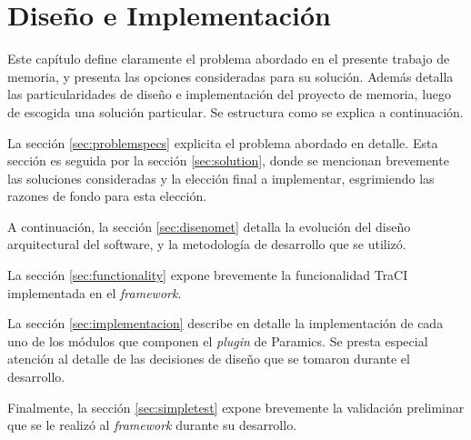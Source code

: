 \chapter{Diseño e Implementación}\label{cap:diseno}

Este capítulo define claramente el problema abordado en el presente trabajo de memoria, y presenta las opciones consideradas para su solución. Además detalla las particularidades de diseño e implementación del proyecto de memoria, luego de escogida una solución particular. Se estructura como se explica a continuación.

La sección \ref{sec:problemspecs} explicita el problema abordado en detalle. Esta sección es seguida por la sección \ref{sec:solution}, donde se mencionan brevemente las soluciones consideradas y la elección final a implementar, esgrimiendo las razones de fondo para esta elección.

A continuación, la sección \ref{sec:disenomet} detalla la evolución del diseño arquitectural del software, y la metodología de desarrollo que se utilizó.

La sección \ref{sec:functionality} expone brevemente la funcionalidad TraCI implementada en el \emph{framework}.

La sección \ref{sec:implementacion} describe en detalle la implementación de cada uno de los módulos que componen el \emph{plugin} de Paramics. Se presta especial atención al detalle de las decisiones de diseño que se tomaron durante el desarrollo.

Finalmente, la sección \ref{sec:simpletest} expone brevemente la validación preliminar que se le realizó al \emph{framework} durante su desarrollo.
\newpage


















\newpage
